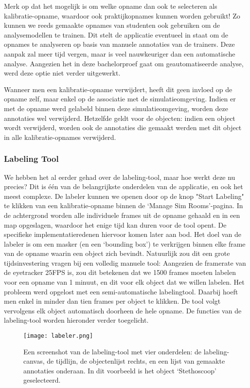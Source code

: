 Merk op dat het mogelijk is om welke opname dan ook te selecteren als kalibratie-opname, waardoor ook praktijkopnames kunnen worden gebruikt!
Zo kunnen we reeds gemaakte opnames van studenten ook gebruiken om de analysemodellen te trainen.
Dit stelt de applicatie eventueel in staat om de opnames te analyseren op basis van manuele annotaties van de trainers.
Deze aanpak zal meer tijd vergen, maar is veel nauwkeuriger dan een automatische analyse. Aangezien het in deze bachelorproef gaat om geautomatiseerde analyse, werd deze optie niet verder uitgewerkt.

Wanneer men een kalibratie-opname verwijdert, heeft dit geen invloed op de opname zelf, maar enkel op de associatie met de simulatieomgeving.
Indien er met de opname werd gelabeld binnen deze simulatieomgeving, worden deze annotaties wel verwijderd. 
Hetzelfde geldt voor de objecten: indien een object wordt verwijderd, worden ook de annotaties die gemaakt werden met dit object in alle kalibratie-opnames verwijderd.

\subsubsection{Labeling Tool}

We hebben het al eerder gehad over de labeling-tool, maar hoe werkt deze nu precies? Dit is één van de belangrijkste onderdelen van de applicatie, en ook het meest complexe.
De labeler kunnen we openen door op de knop "Start Labeling" te klikken van een kalibratie-opname binnen de `Manage Sim Rooms'-pagina.
In de achtergrond worden alle individuele frames uit de opname gehaald en in een map opgeslagen, waardoor het enige tijd kan duren voor de tool opent. De specifieke implementatieredenen hiervoor komen later aan bod.
Het doel van de labeler is om een masker (en een `bounding box') te verkrijgen binnen elke frame van de opname waarin een object zich bevindt.
Natuurlijk zou dit een grote tijdsinvestering vragen bij een volledig manuele tool: Aangezien de framerate van de eyetracker 25FPS is, zou dit betekenen dat we 1500 frames moeten labelen voor een opname van 1 minuut, en dit voor elk object dat we willen labelen.
Het probleem werd opgelost met een semi-automatische labelingtool. Daarbij hoeft men enkel in minder dan tien frames per object te klikken. De tool volgt vervolgens elk object automatisch doorheen de hele opname.
De functies van de labeling-tool worden hieronder verder toegelicht.

\begin{figure}[H]
  \centering
  \texttt{[image: labeler.png]}
  \caption[]{\label{fig:labeler} Een screenshot van de labeling-tool met vier onderdelen: de labeling-canvas, de tijdlijn, de objectenlijst rechts, en een lijst van gemaakte annotaties onderaan. In dit voorbeeld is het object `Stethoscoop' geselecteerd. }
\end{figure}

